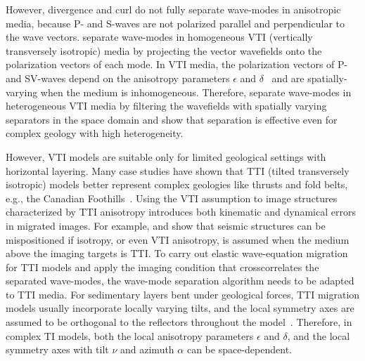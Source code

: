 However, divergence and curl do not fully separate wave-modes in
anisotropic media, because P- and S-waves are not polarized parallel
and perpendicular to the wave vectors.
\cite{GEO55-07-09140919} separate wave-modes in
homogeneous VTI (vertically transversely isotropic) media by
projecting the vector wavefields onto the polarization vectors of each
mode.  In VTI media, the polarization vectors of P- and SV-waves
depend on the anisotropy parameters $\epsilon$ and
$\delta$~\cite[]{thomsen:1954} and are spatially-varying when the
medium is inhomogeneous. Therefore, \cite{yan:WB19} separate
wave-modes in heterogeneous VTI media by filtering the wavefields with
spatially varying separators in the space domain and show that
separation is effective even for complex geology with high
heterogeneity.


However, VTI models are suitable only for limited geological settings
with horizontal layering.  Many case studies have shown that TTI
(tilted transversely isotropic) models better represent complex
geologies like thrusts and fold belts, e.g., the Canadian
Foothills~\cite[]{SEG-1991-0207}. Using the VTI assumption to image
structures characterized by TTI anisotropy introduces both kinematic
and dynamical errors in migrated images. For
example, \cite{vestrum:1239} and \cite{isaac:1230} show that seismic
structures can be mispositioned if isotropy, or even VTI anisotropy,
is assumed when the medium above the imaging targets is TTI. To carry
out elastic wave-equation migration for TTI models and apply the
imaging condition that crosscorrelates the separated wave-modes, the
wave-mode separation algorithm needs to be adapted to TTI media.  For
sedimentary layers bent under geological forces, TTI migration models
usually incorporate locally varying tilts, and the local symmetry axes
are assumed to be orthogonal to the reflectors throughout the
model~\cite[]{charles:VE261,AlkhalifahSava.geo.2010}. Therefore, in
complex TI models, both the local anisotropy parameters $\epsilon$ and
$\delta$, and the local symmetry axes with tilt $\nu$ and azimuth
$\alpha$ can be space-dependent.

